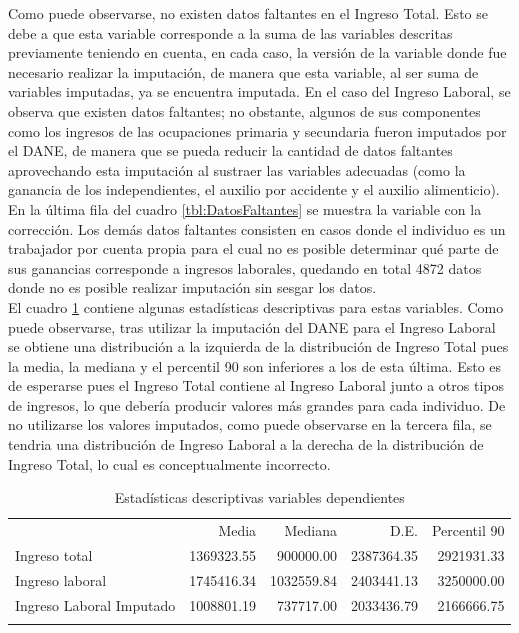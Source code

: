 \documentclass[11pt,a4paper]{article}
\begin{document}
Como puede observarse, no existen datos faltantes en el Ingreso Total. Esto se debe a que esta variable corresponde a la suma de las variables descritas previamente teniendo en cuenta, en cada caso, la versión de la variable donde fue necesario realizar la imputación,
de manera que esta variable, al ser suma de variables imputadas, ya se encuentra imputada. En el caso del Ingreso Laboral, se observa que existen datos faltantes; no obstante, algunos de sus componentes como los ingresos de las ocupaciones primaria y secundaria fueron imputados por el DANE, de manera que se pueda reducir la cantidad de datos faltantes
aprovechando esta imputación al sustraer las variables adecuadas (como la ganancia de los independientes, el auxilio por accidente y el auxilio alimenticio).
En la última fila del cuadro \ref{tbl:DatosFaltantes} se muestra la variable con la corrección. Los demás datos faltantes consisten en casos donde el individuo es un trabajador por cuenta propia para el cual no es posible determinar qué parte de sus ganancias corresponde a ingresos laborales, quedando en total 4872 datos donde no es posible realizar imputación sin sesgar los datos.\\

El cuadro \ref{tbl:estadisticasDesc} contiene algunas estadísticas descriptivas para estas variables. Como puede observarse, tras utilizar la imputación del DANE para el Ingreso Laboral se obtiene una distribución a la izquierda de la distribución de Ingreso Total pues la media, la mediana y el percentil 90 son inferiores a los de esta última. 
Esto es de esperarse pues el Ingreso Total contiene al Ingreso Laboral junto a otros tipos de ingresos, lo que debería producir valores más grandes para cada individuo. De no utilizarse los valores imputados, como puede observarse en la tercera fila, se tendria una distribución de Ingreso Laboral a la derecha de la distribución de Ingreso Total, lo cual es conceptualmente incorrecto.


\begin{table}[H]
  \centering
  \caption{Estadísticas descriptivas variables dependientes} 
  \label{tab:descriptive_dependent}
  \begingroup\fontsize{9pt}{10pt}\selectfont
  \begin{tabular}{lrrrr}
    \hline
  \addlinespace
    & Media & Mediana & D.E. & Percentil 90 \\
  \addlinespace
   \hline
   Ingreso total & 1369323.55 & 900000.00 & 2387364.35 & 2921931.33 \\ 
    Ingreso laboral & 1745416.34 & 1032559.84 & 2403441.13 & 3250000.00 \\ 
    Ingreso Laboral Imputado & 1008801.19 & 737717.00 & 2033436.79 & 2166666.75 \\ 
     \addlinespace
  \hline
  \addlinespace
  \end{tabular}
  \endgroup
  \label{tbl:estadisticasDesc}
  \end{table}
\end{document}

